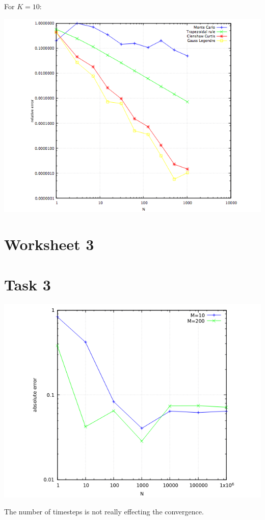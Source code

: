 \documentclass[10pt,a4paper]{article}
\begin{document}
\newpage

For $K=10$:
\begin{center}
\includegraphics[scale=0.5]{relative_errors_K10.png}		
\end{center}	



\section*{Worksheet 3}

\section*{Task 3}

\begin{center}
\includegraphics[scale=0.5]{error_task_3.png}
\end{center}
The number of timesteps is not really effecting the convergence.
\end{document}
